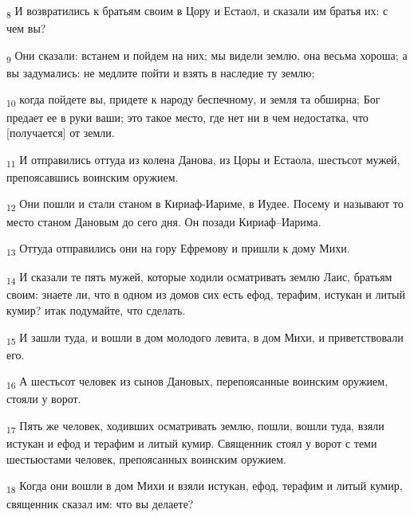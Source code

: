 \begin{tcolorbox}
\textsubscript{8} И возвратились к братьям своим в Цору и Естаол, и сказали им братья их: с чем вы?
\end{tcolorbox}
\begin{tcolorbox}
\textsubscript{9} Они сказали: встанем и пойдем на них; мы видели землю, она весьма хороша; а вы задумались: не медлите пойти и взять в наследие ту землю;
\end{tcolorbox}
\begin{tcolorbox}
\textsubscript{10} когда пойдете вы, придете к народу беспечному, и земля та обширна; Бог предает ее в руки ваши; это такое место, где нет ни в чем недостатка, что [получается] от земли.
\end{tcolorbox}
\begin{tcolorbox}
\textsubscript{11} И отправились оттуда из колена Данова, из Цоры и Естаола, шестьсот мужей, препоясавшись воинским оружием.
\end{tcolorbox}
\begin{tcolorbox}
\textsubscript{12} Они пошли и стали станом в Кириаф-Иариме, в Иудее. Посему и называют то место станом Дановым до сего дня. Он позади Кириаф--Иарима.
\end{tcolorbox}
\begin{tcolorbox}
\textsubscript{13} Оттуда отправились они на гору Ефремову и пришли к дому Михи.
\end{tcolorbox}
\begin{tcolorbox}
\textsubscript{14} И сказали те пять мужей, которые ходили осматривать землю Лаис, братьям своим: знаете ли, что в одном из домов сих есть ефод, терафим, истукан и литый кумир? итак подумайте, что сделать.
\end{tcolorbox}
\begin{tcolorbox}
\textsubscript{15} И зашли туда, и вошли в дом молодого левита, в дом Михи, и приветствовали его.
\end{tcolorbox}
\begin{tcolorbox}
\textsubscript{16} А шестьсот человек из сынов Дановых, перепоясанные воинским оружием, стояли у ворот.
\end{tcolorbox}
\begin{tcolorbox}
\textsubscript{17} Пять же человек, ходивших осматривать землю, пошли, вошли туда, взяли истукан и ефод и терафим и литый кумир. Священник стоял у ворот с теми шестьюстами человек, препоясанных воинским оружием.
\end{tcolorbox}
\begin{tcolorbox}
\textsubscript{18} Когда они вошли в дом Михи и взяли истукан, ефод, терафим и литый кумир, священник сказал им: что вы делаете?
\end{tcolorbox}
